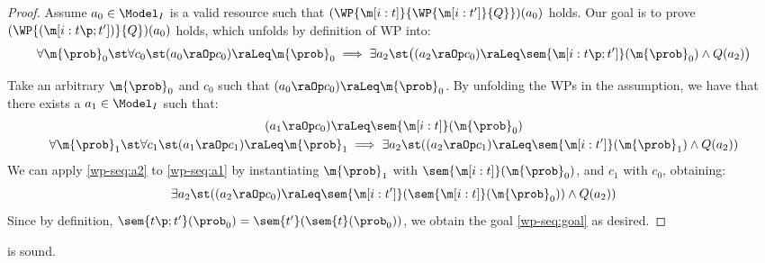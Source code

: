 \begin{proof}
Assume $a_0 \in \Model_I$ is a valid resource such that
  $(\WP {\m[i: t]} {\WP {\m[i: t']} {Q}})(a_0)$ holds.
  Our goal is to prove $(\WP {(\m[i: t\p; t'])} {Q})(a_0)$ holds,
  which unfolds by definition of WP into:
  \begin{equation}
    \forall \m{\prob}_0\st
    \forall c_0 \st
    (a_0 \raOp c_0) \raLeq \m{\prob}_0
    \implies
      \exists a_2 \st
      \bigl(
      (a_2 \raOp c_0) \raLeq \sem{\m[i: t\p; t']}(\m{\prob}_0)
      \land Q(a_2)
      \bigr)
    \label{wp-seq:goal}
  \end{equation}

  Take an arbitrary $\m{\prob}_0$ and $c_0$ such that
  $ (a_0 \raOp c_0) \raLeq \m{\prob}_0 $.
  By unfolding the WPs in the assumption,
  we have that there exists a
  $a_1 \in \Model_I$ such that:
  \begin{gather}
    (a_1 \raOp c_0) \raLeq \sem{\m[i: t]}(\m{\prob}_0)
    \label{wp-seq:a1}
    \\
    \forall \m{\prob}_1\st
    \forall c_1 \st
      (a_1 \raOp c_1) \raLeq \m{\prob}_1
      \implies
      \exists a_2 \st
      ((a_2 \raOp c_1) \raLeq \sem{\m[i: t']}(\m{\prob}_1)
      \land  Q(a_2))
    \label{wp-seq:a2}
  \end{gather}
  We can apply \eqref{wp-seq:a2} to \eqref{wp-seq:a1}
  by instantiating $\m{\prob}_1$ with $\sem{\m[i: t]}(\m{\prob}_0)$,
  and $c_1$ with $c_0$,
  obtaining:
  \[
    \exists a_2 \st
    ((a_2 \raOp c_0) \raLeq \sem{\m[i: t']}(\sem{\m[i: t]}(\m{\prob}_0))
    \land  Q(a_2))
  \]
  Since by definition,
  $ \sem{t\p; t'}(\prob_0) = \sem{t'}(\sem{t}(\prob_0)) $,
  we obtain the goal \eqref{wp-seq:goal} as desired.
\end{proof} \begin{lemma}
\label{proof:wp-assign}
   is sound.
\end{lemma}


